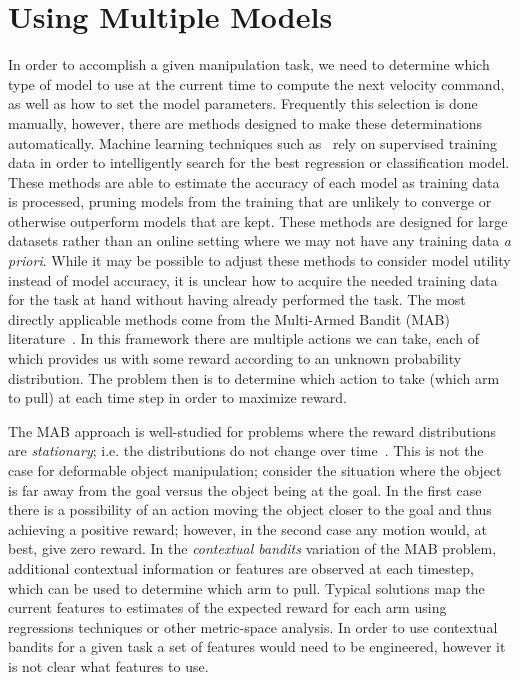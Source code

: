 \section{Using Multiple Models}

In order to accomplish a given manipulation task, we need to determine which type of model to use at the current time to compute the next velocity command, as well as how to set the model parameters. Frequently this selection is done manually, however, there are methods designed to make these determinations automatically. Machine learning techniques such as~\cite{Maron1994, Sparks2015} rely on supervised training data in order to intelligently search for the best regression or classification model. These methods are able to estimate the accuracy of each model as training data is processed, pruning models from the training that are unlikely to converge or otherwise outperform models that are kept. These methods are designed for large datasets rather than an online setting where we may not have any training data \textit{a priori}. While it may be possible to adjust these methods to consider model utility instead of model accuracy, it is unclear how to acquire the needed training data for the task at hand without having already performed the task. The most directly applicable methods come from the Multi-Armed Bandit (MAB) literature~\cite{Whittle1988, Auer2002, Gittins2011}. In this framework there are multiple actions we can take, each of which provides us with some reward according to an unknown probability distribution. The problem then is to determine which action to take (which arm to pull) at each time step in order to maximize reward.

The MAB approach is well-studied for problems where the reward distributions are \textit{stationary}; i.e. the distributions do not change over time~\cite{Auer2002, Agrawal2012}. This is not the case for deformable object manipulation; consider the situation where the object is far away from the goal versus the object being at the goal. In the first case there is a possibility of an action moving the object closer to the goal and thus achieving a positive reward; however, in the second case any motion would, at best, give zero reward. In the \textit{contextual bandits} \cite{Langford2008, Slivkins2014} variation of the MAB problem, additional contextual information or features are observed at each timestep, which can be used to determine which arm to pull. Typical solutions map the current features to estimates of the expected reward for each arm using regressions techniques or other metric-space analysis. In order to use contextual bandits for a given task a set of features would need to be engineered, however it is not clear what features to use.

